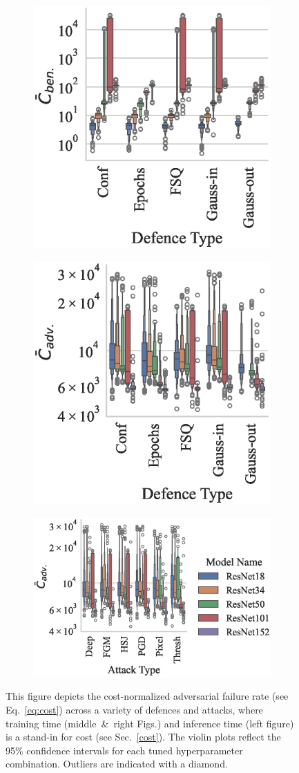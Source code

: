 \begin{figure}[!h]
    \centering
    \begin{subfigure}
        \centering
        \includegraphics[trim={0 5pt 0 5pt},clip,width=.28\textwidth]{cifar100/ben_failures_per_train_time_vs_defence_type.eps}
    \end{subfigure}
    \begin{subfigure}
        \centering
        \includegraphics[trim={0 5pt 0 5pt},clip,width=.28\textwidth]{cifar100/adv_failures_per_train_time_vs_defence_type.eps}
    \end{subfigure}
    \begin{subfigure}
        \centering
        \includegraphics[trim={0 5pt 0 5pt},clip,width=.42\textwidth]{cifar100/adv_failures_per_train_time_vs_attack_type.eps}
    \end{subfigure}
    \caption{This figure depicts the cost-normalized adversarial failure rate (see Eq.~\ref{eq:cost}) across a variety of defences and attacks, where training time (middle~\&~right Figs.) and inference time (left figure) is a stand-in for cost (see Sec.~\ref{cost}). The violin plots reflect the 95\% confidence intervals for each tuned hyperparameter combination. Outliers are indicated with a diamond.}
    \label{fig:failures_per_train_time}
\end{figure}



